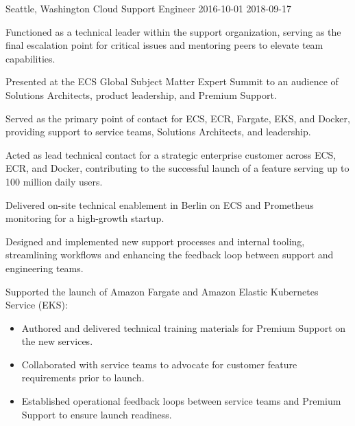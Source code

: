 \begin{role}
{\companyaws}
{Seattle, Washington}
{Cloud Support Engineer }
{2016-10-01}
{2018-09-17}
    \item Functioned as a technical leader within the support organization, serving as the final escalation point for critical issues and mentoring peers to elevate team capabilities.
    \item Presented at the ECS Global Subject Matter Expert Summit to an audience of Solutions Architects, product leadership, and Premium Support.
    \item Served as the primary point of contact for ECS, ECR, Fargate, EKS, and Docker, providing support to service teams, Solutions Architects, and leadership.
    \item Acted as lead technical contact for a strategic enterprise customer across ECS, ECR, and Docker, contributing to the successful launch of a feature serving up to 100 million daily users.
    \item Delivered on-site technical enablement in Berlin on ECS and Prometheus monitoring for a high-growth startup.
    \item Designed and implemented new support processes and internal tooling, streamlining workflows and enhancing the feedback loop between support and engineering teams.
    \item Supported the launch of Amazon Fargate and Amazon Elastic Kubernetes Service (EKS):
          \begin{itemize}
              \item Authored and delivered technical training materials for Premium Support on the new services.
              \item Collaborated with service teams to advocate for customer feature requirements prior to launch.
              \item Established operational feedback loops between service teams and Premium Support to ensure launch readiness.
          \end{itemize}
\end{role}
